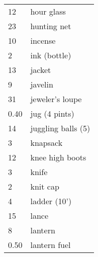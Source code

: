 \begin{normbox}[Equipment]
\begin{tabularx}{\linewidth}{@{} l X }
12 & hour glass\\
23 & hunting net\\
10 & incense\\
2 & ink (bottle)\\
13 & jacket\\
9 & javelin\\
31 & jeweler's loupe\\
0.40 & jug (4 pints)\\
14 & juggling balls (5)\\
3 & knapsack\\
12 & knee high boots\\
3 & knife\\
2 & knit cap\\
4 & ladder (10')\\
15 & lance\\
8 & lantern\\
0.50 & lantern fuel\\
\end{tabularx}
\end{normbox}
